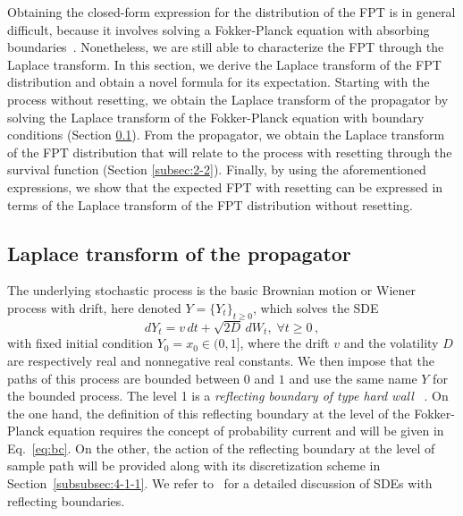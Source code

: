 \documentclass[preprint,12pt]{elsarticle}
\numberwithin{equation}{section}
\theoremstyle{plain} \newtheorem{theorem}{Theorem}[section]
\theoremstyle{plain} \newtheorem{proposition}[theorem]{Proposition}
\theoremstyle{plain} \newtheorem{lemma}[theorem]{Lemma}
\theoremstyle{plain} \newtheorem{corollary}[theorem]{Corollary}
\theoremstyle{definition} \newtheorem{definition}[theorem]{Definition}
\theoremstyle{definition} \newtheorem{notation}[theorem]{Notation}
\theoremstyle{remark} \newtheorem{remark}[theorem]{Remark}
\theoremstyle{remark} \newtheorem{remarks}[theorem]{Remarks}
\theoremstyle{remark} \newtheorem{algorithm2}[theorem]{Algorithm}
\theoremstyle{remark} \newtheorem{example}[theorem]{Example}
\begin{document}
Obtaining the closed-form expression for the distribution of the FPT is in general difficult, because it involves solving a Fokker-Planck equation with absorbing boundaries~\cite{redner2001guide, dyesguerra, voiturezbenichou}. Nonetheless, we are still able to characterize the FPT through the Laplace transform. In this section, we derive the Laplace transform of the FPT distribution and obtain a novel formula for its expectation.
Starting with the process without resetting, we obtain the Laplace transform of the propagator by solving the Laplace transform of the Fokker-Planck equation with boundary conditions \cite{cox65theory} (Section \ref{subsec:2-1}). From the propagator, we obtain the Laplace transform of the FPT distribution \cite{redner2001guide, ramoso_stochastic_2020} that will relate to the process with resetting through the survival function \cite{pal_first_2019, roldan_path-integral_2017} (Section \ref{subsec:2-2}). Finally, by using the aforementioned expressions, we show that the expected FPT with resetting can be expressed in terms of the Laplace transform of the FPT distribution without resetting.

\subsection{Laplace transform of the propagator}\label{subsec:2-1}

The underlying stochastic process is the basic
Brownian motion or Wiener process with drift, here denoted $Y=\{Y_t\}_{t \ge 0}$, which solves the SDE 
\begin{equation}
d Y_t=v\,dt+\sqrt{2D}\,d W_t,\; \forall t\geq 0\,,
 \label{eq:sde}
\end{equation}
with fixed initial condition $Y_0=x_0\in(0,1]$, where the drift 
$v$ and the volatility $D$ are respectively real
and nonnegative real constants.
We then impose that the paths of this process are bounded between $0$ and $1$ and use the same name $Y$ for the bounded process. The level 1 is a \emph{reflecting boundary of type hard wall}~ \cite{redner2001guide}. On the one hand, the definition of this reflecting boundary at the level of the Fokker-Planck equation requires the concept of probability current and will be given in Eq.~\eqref{eq:bc}. On the other, the action of the reflecting boundary at the level of sample path will be provided along with its discretization scheme in Section~\ref{subsubsec:4-1-1}. We refer to~\cite{pilipenko2014introduction} for a detailed discussion of SDEs with reflecting boundaries.
\end{document}
